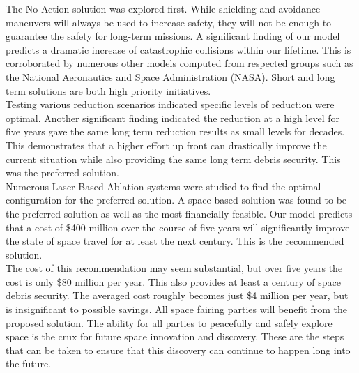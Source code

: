 \documentclass[notitlepage]{report}
\begin{document}
\newpage

The No Action solution was explored first. While shielding and avoidance maneuvers will always be used to increase safety, they will not be enough to guarantee the safety for long-term missions. A significant finding of our model predicts a dramatic increase of catastrophic collisions within our lifetime. This is corroborated by numerous other models computed from respected groups such as the National Aeronautics and Space Administration (NASA). Short and long term solutions are both high priority initiatives. \\


Testing various reduction scenarios indicated specific levels of reduction were optimal. Another significant finding indicated the reduction at a high level for five years gave the same long term reduction results as small levels for decades. This demonstrates that a higher effort up front can drastically improve the current situation while also providing the same long term debris security. This was the preferred solution. \\


Numerous Laser Based Ablation systems were studied to find the optimal configuration for the preferred solution. A space based solution was found to be the preferred solution as well as the most financially feasible. Our model predicts that a cost of \$400 million over the course of five years will significantly improve the state of space travel for at least the next century. This is the recommended solution. \\


The cost of this recommendation may seem substantial, but over five years the cost is only \$80 million per year. This also provides at least a century of space debris security. The averaged cost roughly becomes just \$4 million per year, but is insignificant to possible savings. All space fairing parties will benefit from the proposed solution. The ability for all parties to peacefully and safely explore space is the crux for future space innovation and discovery. These are the steps that can be taken to ensure that this discovery can continue to happen long into the future. \\
\end{document}
